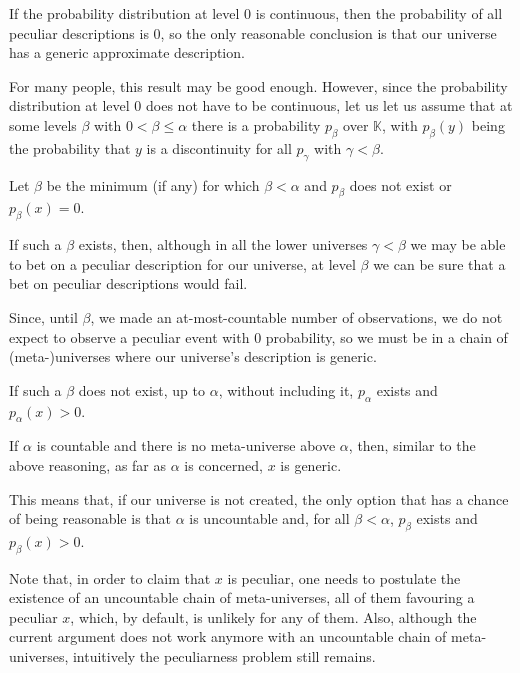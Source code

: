 \documentclass[a4paper
,draft
]{article}
\newcommand{\svn}[2][]{\todo[author=Virgil,color=red!25!white,#1]{#2}}
\def\descriptions{\mathbb{K}}
\begin{document}
If the probability distribution at level $0$ is continuous,
then the probability of all peculiar descriptions is $0$,
so the only reasonable conclusion is that our universe has a generic
approximate description.

For many people, this result may be good enough. However, since the
probability distribution at level $0$ does not have to be continuous,
let us let us assume that at some levels $\beta$ with
$0 < \beta \le \alpha$ there is a probability
$p_\beta$ over $\descriptions$, with $p_\beta(y)$ being
the probability that $y$ is a discontinuity
for all $p_\gamma$ with $\gamma < \beta$.

Let $\beta$ be the minimum (if any) for which $\beta < \alpha$ and
$p_\beta$ does not exist or $p_\beta(x) = 0$.


If such a $\beta$ exists, then, although in all the lower universes
$\gamma < \beta$ we may be able to bet on a peculiar description for our
universe, at level $\beta$ we can be sure that a bet on peculiar descriptions
would fail.

Since, until $\beta$, we made an at-most-countable number of observations, we
do not expect to observe a peculiar event with $0$ probability, so we must be
in a chain of (meta-)universes where our universe's description is
generic.

If such a $\beta$ does not exist, up to $\alpha$, without including it,
$p_\alpha$ exists and $p_\alpha(x) > 0$.

If $\alpha$ is countable and there is no meta-universe above $\alpha$,
then, similar to the above reasoning, as far as $\alpha$ is concerned,
$x$ is generic.

This means that, if our universe is not created, the only option that
has a chance of being reasonable is that $\alpha$ is uncountable and,
for all $\beta < \alpha$, $p_\beta$ exists and $p_\beta(x) > 0$.

Note that, in order to claim that $x$ is peculiar, one needs to postulate the
existence of an uncountable chain of meta-universes, all of them favouring a
peculiar $x$, which, by default, is unlikely for any of them. Also, although the
current argument does not work anymore with an uncountable chain of
meta-universes, intuitively the peculiarness problem still remains.
\end{document}
